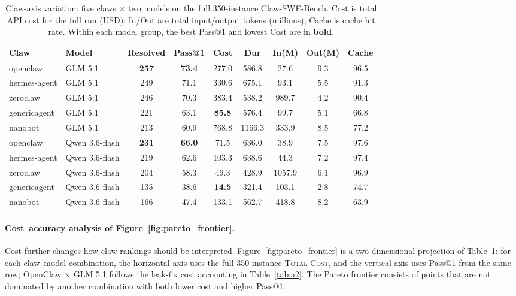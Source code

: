 \documentclass{llmxive}
\providecommand{\arraystretch}{1.0}
\begin{document}
\begin{table}[t]
  \centering
  \scriptsize
  \renewcommand{\arraystretch}{1}
  \setlength{\tabcolsep}{3.0pt}
  \begin{tabular*}{0.95\linewidth}{@{\extracolsep{\fill}}ll|ccccccc@{}}
    \toprule
    \textbf{Claw} & \textbf{Model} & \textbf{Resolved} & \textbf{Pass@1} & \textbf{Cost} & \textbf{Dur} & \textbf{In(M)} & \textbf{Out(M)} & \textbf{Cache} \\
    \midrule
    openclaw     & GLM 5.1        & \textbf{257} & \textbf{73.4} & 277.0 & 586.8 & 27.6 & 9.3 & 96.5 \\
    hermes-agent & GLM 5.1        & 249 & 71.1 & 330.6 & 675.1 & 93.1 & 5.5 & 91.3 \\
    zeroclaw     & GLM 5.1        & 246 & 70.3 & 383.4 & 538.2 & 989.7 & 4.2 & 90.4 \\
    genericagent      & GLM 5.1        & 221 & 63.1 & \textbf{85.8} & 576.4 & 99.7 & 5.1 & 66.8 \\
    nanobot      & GLM 5.1        & 213 & 60.9 & 768.8 & 1166.3 & 333.9 & 8.5 & 77.2 \\
    \midrule
    openclaw     & Qwen 3.6-flash & \textbf{231} & \textbf{66.0} & 71.5 & 636.0 & 38.9 & 7.5 & 97.6 \\
    hermes-agent & Qwen 3.6-flash & 219 & 62.6 & 103.3 & 638.6 & 44.3 & 7.2 & 97.4 \\
    zeroclaw     & Qwen 3.6-flash & 204 & 58.3 & 49.3 & 428.9 & 1057.9 & 6.1 & 96.9 \\
    genericagent      & Qwen 3.6-flash & 135 & 38.6 & \textbf{14.5} & 321.4 & 103.1 & 2.8 & 74.7 \\
    nanobot      & Qwen 3.6-flash & 166 & 47.4 & 133.1 & 562.7 & 418.8 & 8.2 & 63.9 \\
    
    \bottomrule
  \end{tabular*}
\caption{Claw-axis variation: five claws $\times$ two models on the full 350-instance Claw-SWE-Bench. Cost is total API cost for the full run (USD); In/Out are total input/output tokens (millions); Cache is cache hit rate. Within each model group, the best Pass@1 and lowest Cost are in \textbf{bold}.}
\label{tab:b}
\end{table}

\paragraph{Cost--accuracy analysis of Figure~\ref{fig:pareto_frontier}.}
Cost further changes how claw rankings should be interpreted. Figure~\ref{fig:pareto_frontier} is a two-dimensional projection of Table~\ref{tab:b}: for each claw--model combination, the horizontal axis uses the full 350-instance \textsc{Total Cost}, and the vertical axis uses Pass@1 from the same row; OpenClaw $\times$ GLM 5.1 follows the leak-fix cost accounting in Table~\ref{tab:a2}. The Pareto frontier consists of points that are not dominated by another combination with both lower cost and higher Pass@1.
\end{document}
